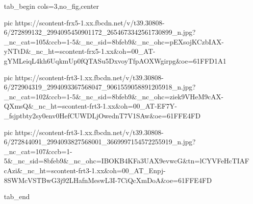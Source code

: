  
 
 
 
 


\ifcmt
  tab_begin cols=3,no_fig,center

     pic https://scontent-frx5-1.xx.fbcdn.net/v/t39.30808-6/272899132_2994095450901172_2654673342561730899_n.jpg?_nc_cat=105&ccb=1-5&_nc_sid=8bfeb9&_nc_ohc=pEXsojKCzbIAX-yNTtD&_nc_ht=scontent-frx5-1.xx&oh=00_AT-gYMLeiqL4kh6UqkmUp0fQTASu5DxvoyTfpAOXWgirpg&oe=61FFD1A1

     pic https://scontent-frt3-1.xx.fbcdn.net/v/t39.30808-6/272904319_2994093367568047_9061559058891205918_n.jpg?_nc_cat=102&ccb=1-5&_nc_sid=8bfeb9&_nc_ohc=ziek9VHeM9cAX-QXmsQ&_nc_ht=scontent-frt3-1.xx&oh=00_AT-EF7Y-_fsjptbty2sy0env0HefCUWDLjOwednT7V1SAw&oe=61FFE4FD

     pic https://scontent-frt3-1.xx.fbcdn.net/v/t39.30808-6/272844091_2994093827568001_3669997154572255919_n.jpg?_nc_cat=107&ccb=1-5&_nc_sid=8bfeb9&_nc_ohc=IBOKB4KFa3UAX9evwcG&tn=lCYVFeHcTIAFcAzi&_nc_ht=scontent-frt3-1.xx&oh=00_AT_Enpj-8SWMcVSTBwG3j92LHafnMeswL3I-7CiQcXmDoA&oe=61FFE4FD

  tab_end
\fi
